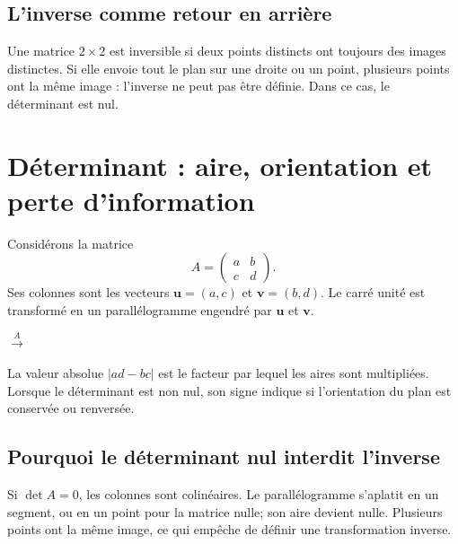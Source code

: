 \subsection{L'inverse comme retour en arrière}
Une matrice $2\times2$ est inversible si deux points distincts ont toujours des images distinctes. Si elle envoie tout le plan sur une droite ou un point, plusieurs points ont la même image : l'inverse ne peut pas être définie. Dans ce cas, le déterminant est nul.


\section{Déterminant : aire, orientation et perte d'information}
\label{manual:section:11.07}

Considérons la matrice
\[
A=\begin{pmatrix}a&b\\c&d\end{pmatrix}.
\]
Ses colonnes sont les vecteurs $\mathbf u=(a,c)$ et $\mathbf v=(b,d)$. Le carré unité est transformé en un parallélogramme engendré par $\mathbf u$ et $\mathbf v$.

\begin{center}
\quad $\xrightarrow{A}$ \quad
{}
\end{center}

La valeur absolue $|ad-bc|$ est le facteur par lequel les aires sont multipliées. Lorsque le déterminant est non nul, son signe indique si l'orientation du plan est conservée ou renversée.

\subsection{Pourquoi le déterminant nul interdit l'inverse}
Si $\det A=0$, les colonnes sont colinéaires. Le parallélogramme s'aplatit en un segment, ou en un point pour la matrice nulle; son aire devient nulle. Plusieurs points ont la même image, ce qui empêche de définir une transformation inverse.

